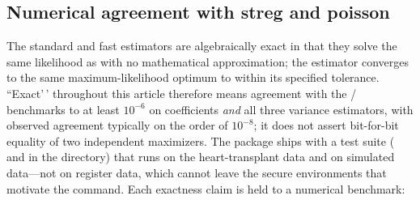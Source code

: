 \documentclass[12pt,a4paper]{article}
\begin{document}
\label{sec:validation}

\subsection{Numerical agreement with streg and
poisson}\label{numerical-agreement-with-streg-and-poisson}

The standard and fast estimators are algebraically exact in that they
solve the same likelihood as  with no mathematical
approximation; the  estimator converges to the same
maximum-likelihood optimum to within its specified tolerance.
``Exact'\,' throughout this article therefore means agreement with the
/ benchmarks to at least \(10^{-6}\) on
coefficients \emph{and} all three variance estimators, with observed
agreement typically on the order of \(10^{-8}\); it does not assert
bit-for-bit equality of two independent maximizers. The package ships
with a test suite ( and
 in the  directory) that runs
on the  heart-transplant data and on simulated data---not
on register data, which cannot leave the secure environments that
motivate the command. Each exactness claim is held to a numerical
benchmark:
\end{document}
